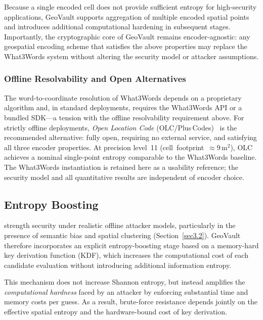 \documentclass[mathematics,article,accept,pdftex,moreauthors]{Definitions/mdpi}
\begin{document}
Because a single encoded cell does not provide sufficient entropy for high-security applications, GeoVault supports aggregation of multiple encoded spatial points and introduces additional computational hardening in subsequent stages. Importantly, the cryptographic core of GeoVault remains encoder-agnostic: any geospatial encoding scheme that satisfies the above properties may replace the What3Words system without altering the security model or attacker assumptions.

\subsubsection{Offline Resolvability and Open Alternatives} 
{The word-to-coordinate resolution of What3Words depends on a proprietary algorithm and, in standard deployments, requires the What3Words API or a bundled SDK---a tension with the offline resolvability requirement above. For strictly offline deployments, \emph{Open Location Code} (OLC/Plus\,Codes)~\cite{Mai2022} is the recommended alternative: fully open, requiring no external service, and satisfying all three encoder properties. At precision level~11 \mbox{(cell footprint $\approx 9\,\mathrm{m}^2$)}, OLC achieves a nominal single-point entropy comparable to the What3Words baseline. The What3Words instantiation is retained here as a usability reference; the security model and all quantitative results are independent of encoder choice.}

\subsection{Entropy Boosting}
\label{sec:entropy_boosting}

strength security under realistic offline attacker models, particularly in the presence of semantic bias and spatial clustering (Section~\ref{sec3.2}). GeoVault therefore incorporates an explicit entropy-boosting stage based on a memory-hard key derivation function (KDF), which increases the computational cost of each candidate evaluation without introducing additional information entropy.

This mechanism does not increase Shannon entropy, but instead amplifies the \emph{computational hardness} faced by an attacker by enforcing substantial time and memory costs per guess. As a result, brute-force resistance depends jointly on the effective spatial entropy and the hardware-bound cost of key derivation.
\end{document}
